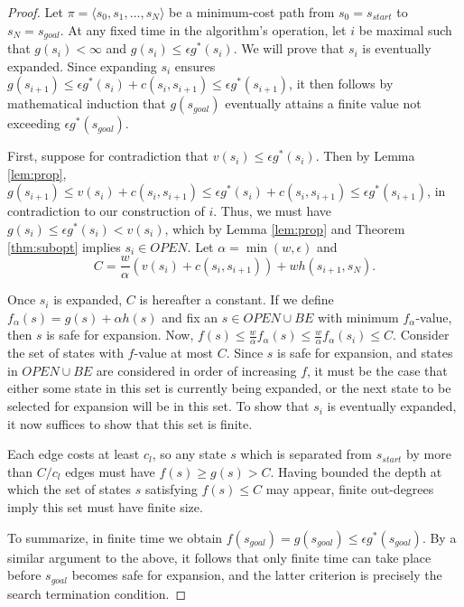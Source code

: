\documentclass[letterpaper]{article}
\begin{document}
\begin{proof}

Let $\pi = \langle s_0,s_1,\ldots,s_N \rangle$ be a minimum-cost path from $s_0 = s_{start}$ to $s_N = s_{goal}$. At any fixed time in the algorithm's operation, let $i$ be maximal such that $g(s_i)<\infty$ and $g(s_i)\le\epsilon g^*(s_i)$. We will prove that $s_i$ is eventually expanded. Since expanding $s_i$ ensures $g(s_{i+1})\le \epsilon g^*(s_i)+c(s_i,s_{i+1})\le\epsilon g^*(s_{i+1})$, it then follows by mathematical induction that $g(s_{goal})$ eventually attains a finite value not exceeding $\epsilon g^*(s_{goal})$.

First, suppose for contradiction that $v(s_i)\le \epsilon g^*(s_i)$. Then by Lemma \ref{lem:prop}, $g(s_{i+1}) \le v(s_i)+c(s_i,s_{i+1})\le\epsilon g^*(s_i)+c(s_i,s_{i+1})\le\epsilon g^*(s_{i+1})$, in contradiction to our construction of $i$. Thus, we must have $g(s_i)\le\epsilon g^*(s_i)<v(s_i)$, which by Lemma \ref{lem:prop} and Theorem \ref{thm:subopt} implies $s_i\in OPEN$. Let $\alpha = \min(w,\epsilon)$ and
\[C = \frac w\alpha \left( v(s_i) + c(s_i, s_{i+1}) \right) + wh(s_{i+1}, s_N).\]

Once $s_i$ is expanded, $C$ is hereafter a constant. If we define $f_\alpha(s) = g(s) + \alpha h(s)$ and fix an $s\in OPEN\cup BE$ with minimum $f_\alpha$-value, then $s$ is safe for expansion. Now, $f(s) \le \frac w\alpha f_\alpha(s) \le \frac w\alpha f_\alpha(s_i) \le C$. Consider the set of states with $f$-value at most $C$. Since $s$ is safe for expansion, and states in $OPEN\cup BE$ are considered in order of increasing $f$, it must be the case that either some state in this set is currently being expanded,  or the next state to be selected for expansion will be in this set. To show that $s_i$ is eventually expanded, it now suffices to show that this set is finite.

Each edge costs at least $c_l$, so any state $s$ which is separated from $s_{start}$ by more than $C/c_l$ edges must have $f(s) \ge g(s) > C$. Having bounded the depth at which the set of states $s$ satisfying $f(s) \le C$ may appear, finite out-degrees imply this set must have finite size.

To summarize, in finite time we obtain $f(s_{goal}) = g(s_{goal}) \le \epsilon g^*(s_{goal})$. By a similar argument to the above, it follows that only finite time can take place before $s_{goal}$ becomes safe for expansion, and the latter criterion is precisely the search termination condition.
\end{proof}
\end{document}
